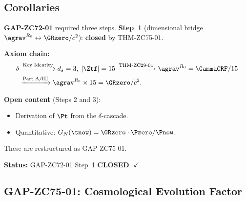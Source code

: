 \documentclass[12pt, a4paper]{article}
\begin{document}
\subsection{Corollaries}
\label{sec:cors}


\begin{formalbox}[title={COR-ZC75-01: GAP-ZC72-01 Algebraic Component
  CLOSED ($R_0$, Exact)}]

\textbf{GAP-ZC72-01} required three steps.
\textbf{Step~1} (dimensional bridge $\agrav^{R_0} \leftrightarrow
\GRzero/c^2$): \textbf{closed} by THM-ZC75-01.

\textbf{Axiom chain:}
\begin{align*}
  \delta
  &\xrightarrow{\text{Key Identity}}
  d_s=3,\; |\Ztf|=15
  \xrightarrow{\text{THM-ZC29-01}}
  \agrav^{R_0} = \GammaCRF/15 \\
  &\xrightarrow{\text{Part~A/III}}
  \agrav^{R_0} \times 15 = \GRzero/c^2.
\end{align*}

\textbf{Open content} (Steps 2 and 3):
\begin{itemize}[leftmargin=2em, noitemsep]
  \item Derivation of $\Pt$ from the $\delta$-cascade.
  \item Quantitative: $G_N(\tnow) = \GRzero \cdot \Pzero/\Pnow$.
\end{itemize}
These are restructured as GAP-ZC75-01.

\textbf{Status:} GAP-ZC72-01 Step~1 \textbf{CLOSED}. $\checkmark$
\end{formalbox}

\subsection{GAP-ZC75-01: Cosmological Evolution Factor}
\label{sec:gap01}
\end{document}
